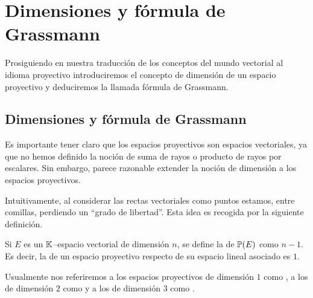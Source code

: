 \section{Dimensiones y fórmula de Grassmann}
Prosiguiendo en nuestra traducción de los conceptos del mundo vectorial al idioma proyectivo introduciremos el concepto de dimensión de un espacio proyectivo y deduciremos la llamada fórmula de Grassmann.

\subsection{Dimensiones y fórmula de Grassmann}
Es importante tener claro que los espacios proyectivos  son espacios vectoriales, ya que no hemos definido la noción de suma de rayos o producto de rayos por escalares. Sin embargo, parece razonable extender la noción de dimensión a los espacios proyectivos.

Intuitivamente, al considerar las rectas vectoriales como puntos estamos, entre comillas, perdiendo un ``grado de libertad''. Esta idea es recogida por la siguiente definición. 
\begin{defi}
	Si $E$ es un $\mathbb{K}$--espacio vectorial de dimensión $n$, se define la  de $\mathbb{P}(E)$ como $n-1$. Es decir, la  de un espacio proyectivo respecto de su espacio lineal asociado es $1$.
\end{defi}
Usualmente nos referiremos a los espacios proyectivos de dimensión $1$ como , a los de dimensión $2$ como  y a los de dimensión $3$ como .

